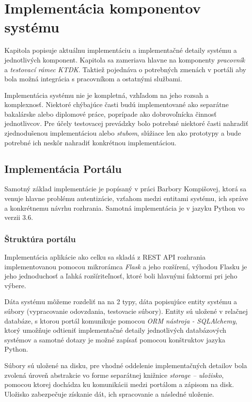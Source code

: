 \documentclass[
  digital, %
  twoside, %
  table,   %
  lof,     %
  lot,     %
]{fithesis3}
\begin{document}
\chapter{Implementácia komponentov systému}

Kapitola popisuje aktuálnu implementáciu a implementačné detaily systému a jednotlivých komponent. Kapitola sa zameriava hlavne na komponenty \emph{pracovník} a \emph{testovací rámec KTDK}. Taktiež pojednáva o potrebných zmenách v portáli aby bola možná integrácia s pracovníkom a ostatnými službami.

Implementácia systému nie je kompletná, vzhľadom na jeho rozsah a komplexnosť. Niektoré chýbajúce časti budú implementované ako separátne bakalárske alebo diplomové práce, poprípade ako dobrovoľnícka činnosť jednotlivcov. Pre účely testovacej prevádzky bolo potrebné niektoré časti nahradiť zjednodušenou implementáciou alebo \emph{stubom}, slúžiace len ako prototypy a bude potrebné ich neskôr nahradiť konkrétnou implementáciou.


\section{Implementácia Portálu}

Samotný základ implementácie je popísaný v práci Barbory Kompišovej, ktorá sa venuje hlavne problému autentizácie, vzťahom medzi entitami systému, ich správe a konkrétnemu návrhu rozhrania. Samotná implementácia je v jazyku Python vo verzii 3.6. 


\subsection{Štruktúra portálu}

Implementácia aplikácie ako celku sa skladá z REST API rozhrania implementovanou pomocou mikrorámca \emph{Flask} a jeho rozšírení, výhodou Flasku je jeho jednoduchosť a ľahká rozšíriteľnosť, ktoré boli hlavnými faktormi pri jeho výbere.

Dáta systému môžeme rozdeliť na na 2 typy, dáta popisujúce entity systému a súbory (vypracovanie odovzdania, testovacie súbory). 
Entity sú uložené v relačnej databáze, s ktorou portál komunikuje pomocou \emph{ORM nástroja - SQLAlchemy}, ktorý umožňuje odtieniť implementačné detaily jednotlivých databázových systémov a samotné dotazy je možné zapísať pomocou konštruktov jazyka Python.

Súbory sú uložené na disku, pre vhodné oddelenie implementačných detailov bola zvolená úroveň abstrakcie vo forme separátnej knižnice \emph{storage -- uložisko}, pomocou ktorej dochádza ku komunikácii medzi portálom a zápisom na disk. Uložisko zabezpečuje získanie dát, ich spracovanie a následné uloženie.
\end{document}

